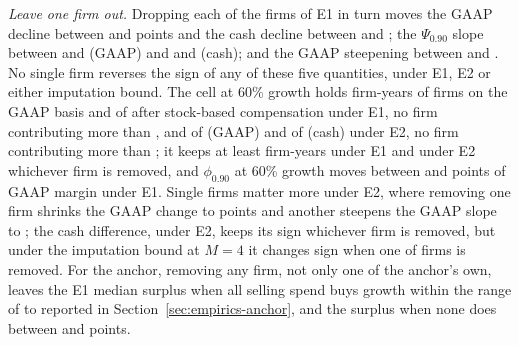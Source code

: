 \emph{Leave one firm out.} Dropping each of the \VFirmsEone{} firms of E1 in turn moves the GAAP decline between \ScLoTopOpEoneLo{} and \ScLoTopOpEoneHi{} points and the cash decline between \ScLoTopCashEoneLo{} and \ScLoTopCashEoneHi; the $\Psi_{0.90}$ slope between \ScLoPsiOpEoneLo{} and \ScLoPsiOpEoneHi{} (GAAP) and \ScLoPsiCashEoneLo{} and \ScLoPsiCashEoneHi{} (cash); and the GAAP steepening between \ScLoDiffOpEoneLo{} and \ScLoDiffOpEoneHi. No single firm reverses the sign of any of these five quantities, under E1, E2 or either imputation bound. The cell at 60\% growth holds \CellSixtyOpEoneN{} firm-years of \CellSixtyOpEoneFirms{} firms on the GAAP basis and \CellSixtyCashEoneN{} of \CellSixtyCashEoneFirms{} after stock-based compensation under E1, no firm contributing more than \CellSixtyMaxEone, and \CellSixtyOpEtwoN{} of \CellSixtyOpEtwoFirms{} (GAAP) and \CellSixtyCashEtwoN{} of \CellSixtyCashEtwoFirms{} (cash) under E2, no firm contributing more than \CellSixtyMaxEtwo; it keeps at least \ScLoCellEoneMin{} firm-years under E1 and \ScLoCellEtwoMin{} under E2 whichever firm is removed, and $\phi_{0.90}$ at 60\% growth moves between \ScLoPhiOpEoneLo{} and \ScLoPhiOpEoneHi{} points of GAAP margin under E1. Single firms matter more under E2, where removing one firm shrinks the GAAP change to \ScLoTopOpEtwoHi{} points and another steepens the GAAP slope to \ScLoPsiOpEtwoLo; the cash difference, \PsiDiffCashEtwo{} under E2, keeps its sign whichever firm is removed, but under the imputation bound at $M=4$ it changes sign when one of \ScLoDiffCashReversalsImpFour{} firms is removed. For the anchor, removing any firm, not only one of the anchor's own, leaves the E1 median surplus when all selling spend buys growth within the range of \AncLooLo{} to \AncLooHi{} reported in Section~\ref{sec:empirics-anchor}, and the surplus when none does between \ScLoAncLbEoneLo{} and \ScLoAncLbEoneHi{} points.

